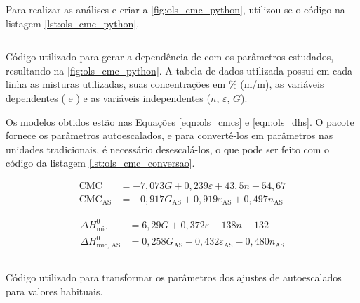 		Para realizar as análises e criar a \autoref{fig:ols_cmc_python}, utilizou-se o código na listagem \ref{lst:ols_cmc_python}.
		
		\begin{listing}[h]
			\inputminted{python}{./python/ols_cmc_statsmodels.py}
			\caption{Código utilizado para gerar a dependência de \cmc{} com os parâmetros estudados, resultando na \autoref{fig:ols_cmc_python}. A tabela de dados utilizada possui em cada linha as misturas utilizadas, suas concentrações em \% (m/m), as variáveis dependentes (\cmc{} e \DHmic) e as variáveis independentes (\(n\), \(\varepsilon\), \(G\)).}
			\label{lst:ols_cmc_python}
		\end{listing}
		
		Os modelos obtidos estão nas Equações \ref{eqn:ols_cmcs} e \ref{eqn:ols_dhs}. O pacote fornece os parâmetros autoescalados, e para convertê-los em parâmetros nas unidades tradicionais, é necessário desescalá-los, o que pode ser feito com o código da listagem \ref{lst:ols_cmc_conversao}.
		
		\begin{subequations}
			\begin{align}
			\textrm{CMC}               & = -7{,}073G              + 0{,}239\varepsilon             + 43{,}5n              -54{,}67  \label{eqn:ols_cmc}     \\
			\textrm{CMC}_{\textrm{AS}} & = -0{,}917G_\textrm{AS}  + 0{,}919\varepsilon_\textrm{AS} +0{,}497n_\textrm{AS}          \label{eqn:ols_cmc_AS}
			\end{align}
			\label{eqn:ols_cmcs}
		\end{subequations}
		
		\begin{subequations}
			\begin{align}
			\Delta H_\textrm{mic}^0     & = 6{,}29G              + 0{,}372\varepsilon             - 138n               + 132  \label{eqn:ols_dh} \\
			\Delta H_\textrm{mic, AS}^0 & = 0{,}258G_\textrm{AS} + 0{,}432\varepsilon_\textrm{AS} - 0{,}480n_\textrm{AS}        \label{eqn:ols_dh_AS}
			\end{align}
			\label{eqn:ols_dhs}
		\end{subequations}
		
		\begin{listing}[h]
			\inputminted{python}{./python/ols_cmc_conversão.py}
			\caption{Código utilizado para transformar os parâmetros dos ajustes de autoescalados para valores habituais.}
			\label{lst:ols_cmc_conversao}
		\end{listing}
		
